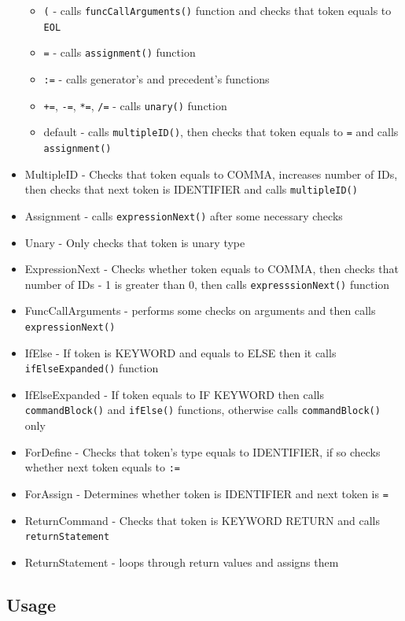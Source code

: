 \documentclass[11pt, titlepage]{article}
\begin{document}
\begin{itemize}[itemsep=-5pt]
  \begin{itemize}[itemsep=-5pt]
  \item
    \texttt{(} - calls \texttt{funcCallArguments()} function and checks that token
    equals to \texttt{EOL}
  \item
    \texttt{=} - calls \texttt{assignment()} function
  \item
    \texttt{:=} - calls generator's and precedent's functions
  \item
    \texttt{+=}, \texttt{-=}, \texttt{*=}, \texttt{/=} - calls
    \texttt{unary()} function
  \item
    default - calls \texttt{multipleID()}, then checks that token equals
    to \texttt{=} and calls \texttt{assignment()}
  \end{itemize}
\item
  MultipleID - Checks that token equals to COMMA, increases number of
  IDs, then checks that next token is IDENTIFIER and calls
  \texttt{multipleID()}
\item
  Assignment - calls \texttt{expressionNext()} after some necessary checks
\item
  Unary - Only checks that token is unary type
\item
  ExpressionNext - Checks whether token equals to COMMA, then checks
  that number of IDs - 1 is greater than 0, then calls
  \texttt{expresssionNext()} function
\item
  FuncCallArguments - performs some checks on arguments and then calls \texttt{expressionNext()}
\item
  IfElse - If token is KEYWORD and equals to ELSE then it calls
  \texttt{ifElseExpanded()} function
\item
  IfElseExpanded - If token equals to IF KEYWORD then calls
  \texttt{commandBlock()} and \texttt{ifElse()} functions, otherwise calls
  \texttt{commandBlock()} only
\item
  ForDefine - Checks that token's type equals to IDENTIFIER, if so
  checks whether next token equals to \texttt{:=}
\item
  ForAssign - Determines whether token is IDENTIFIER and next token is
  \texttt{=}
\item
  ReturnCommand - Checks that token is KEYWORD RETURN and calls
  \texttt{returnStatement}
\item
  ReturnStatement - loops through return values and assigns them
\end{itemize}

\subsection{Usage}\label{usage-1}
\end{document}
